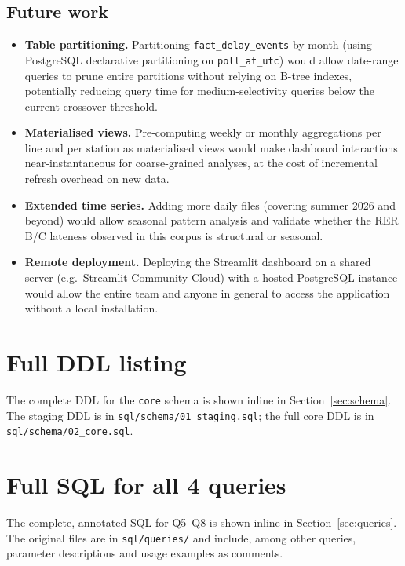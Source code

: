 \documentclass[a4paper,11pt]{article}
\begin{document}
\subsection{Future work}

\begin{itemize}
  \item \textbf{Table partitioning.}
    Partitioning \texttt{fact\_delay\_events} by month (using PostgreSQL declarative
    partitioning on \texttt{poll\_at\_utc}) would allow date-range queries to prune
    entire partitions without relying on B-tree indexes, potentially reducing
    query time for medium-selectivity queries below the current crossover threshold.

  \item \textbf{Materialised views.}
    Pre-computing weekly or monthly aggregations per line and per station as
    materialised views would make dashboard interactions near-instantaneous for
    coarse-grained analyses, at the cost of incremental refresh overhead on new data.

  \item \textbf{Extended time series.}
    Adding more daily files (covering summer 2026 and beyond) would allow
    seasonal pattern analysis and validate whether the RER\,B/C lateness
    observed in this corpus is structural or seasonal.

  \item \textbf{Remote deployment.}
    Deploying the Streamlit dashboard on a shared server (e.g.\ Streamlit Community
    Cloud) with a hosted PostgreSQL instance would allow the entire team and
    anyone in general to access the application without a local installation.

\end{itemize}

\appendix

\section{Full DDL listing}
\label{app:ddl}

The complete DDL for the \texttt{core} schema is shown inline in
Section~\ref{sec:schema}. The staging DDL is in
\texttt{sql/schema/01\_staging.sql}; the full core DDL is in
\texttt{sql/schema/02\_core.sql}.

\section{Full SQL for all 4 queries}
\label{app:sql}

The complete, annotated SQL for Q5--Q8 is shown inline in
Section~\ref{sec:queries}.
The original files are in \texttt{sql/queries/} and include, among other queries, 
parameter descriptions and usage examples as comments.
\end{document}
